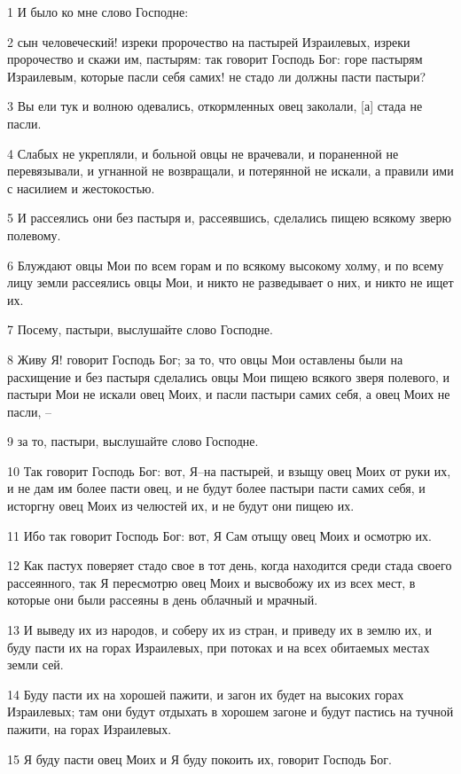 \par 1 И было ко мне слово Господне:
\par 2 сын человеческий! изреки пророчество на пастырей Израилевых, изреки пророчество и скажи им, пастырям: так говорит Господь Бог: горе пастырям Израилевым, которые пасли себя самих! не стадо ли должны пасти пастыри?
\par 3 Вы ели тук и волною одевались, откормленных овец заколали, [а] стада не пасли.
\par 4 Слабых не укрепляли, и больной овцы не врачевали, и пораненной не перевязывали, и угнанной не возвращали, и потерянной не искали, а правили ими с насилием и жестокостью.
\par 5 И рассеялись они без пастыря и, рассеявшись, сделались пищею всякому зверю полевому.
\par 6 Блуждают овцы Мои по всем горам и по всякому высокому холму, и по всему лицу земли рассеялись овцы Мои, и никто не разведывает о них, и никто не ищет их.
\par 7 Посему, пастыри, выслушайте слово Господне.
\par 8 Живу Я! говорит Господь Бог; за то, что овцы Мои оставлены были на расхищение и без пастыря сделались овцы Мои пищею всякого зверя полевого, и пастыри Мои не искали овец Моих, и пасли пастыри самих себя, а овец Моих не пасли, --
\par 9 за то, пастыри, выслушайте слово Господне.
\par 10 Так говорит Господь Бог: вот, Я--на пастырей, и взыщу овец Моих от руки их, и не дам им более пасти овец, и не будут более пастыри пасти самих себя, и исторгну овец Моих из челюстей их, и не будут они пищею их.
\par 11 Ибо так говорит Господь Бог: вот, Я Сам отыщу овец Моих и осмотрю их.
\par 12 Как пастух поверяет стадо свое в тот день, когда находится среди стада своего рассеянного, так Я пересмотрю овец Моих и высвобожу их из всех мест, в которые они были рассеяны в день облачный и мрачный.
\par 13 И выведу их из народов, и соберу их из стран, и приведу их в землю их, и буду пасти их на горах Израилевых, при потоках и на всех обитаемых местах земли сей.
\par 14 Буду пасти их на хорошей пажити, и загон их будет на высоких горах Израилевых; там они будут отдыхать в хорошем загоне и будут пастись на тучной пажити, на горах Израилевых.
\par 15 Я буду пасти овец Моих и Я буду покоить их, говорит Господь Бог.
